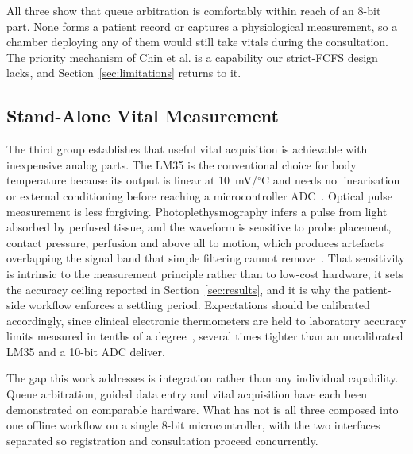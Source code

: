 All three show that queue arbitration is comfortably within reach of an 8-bit part. None forms a
patient record or captures a physiological measurement, so a chamber deploying any of them would
still take vitals during the consultation. The priority mechanism of Chin et al. is a capability our
strict-FCFS design lacks, and Section~\ref{sec:limitations} returns to it.

\subsection{Stand-Alone Vital Measurement}
The third group establishes that useful vital acquisition is achievable with inexpensive analog
parts. The LM35 is the conventional choice for body temperature because its output is linear at
10~mV/$^{\circ}$C and needs no linearisation or external conditioning before reaching a
microcontroller ADC~\cite{ti2022}. Optical pulse measurement is less forgiving.
Photoplethysmography infers a pulse from light absorbed by perfused tissue, and the waveform is
sensitive to probe placement, contact pressure, perfusion and above all to motion, which produces
artefacts overlapping the signal band that simple filtering cannot remove~\cite{allen2007ppg}. That
sensitivity is intrinsic to the measurement principle rather than to low-cost hardware, it sets the
accuracy ceiling reported in Section~\ref{sec:results}, and it is why the patient-side workflow
enforces a settling period. Expectations should be calibrated accordingly, since clinical electronic
thermometers are held to laboratory accuracy limits measured in tenths of a
degree~\cite{iso80601}, several times tighter than an uncalibrated LM35 and a 10-bit ADC deliver.

The gap this work addresses is integration rather than any individual capability. Queue
arbitration, guided data entry and vital acquisition have each been demonstrated on comparable
hardware. What has not is all three composed into one offline workflow on a single 8-bit
microcontroller, with the two interfaces separated so registration and consultation proceed
concurrently.
